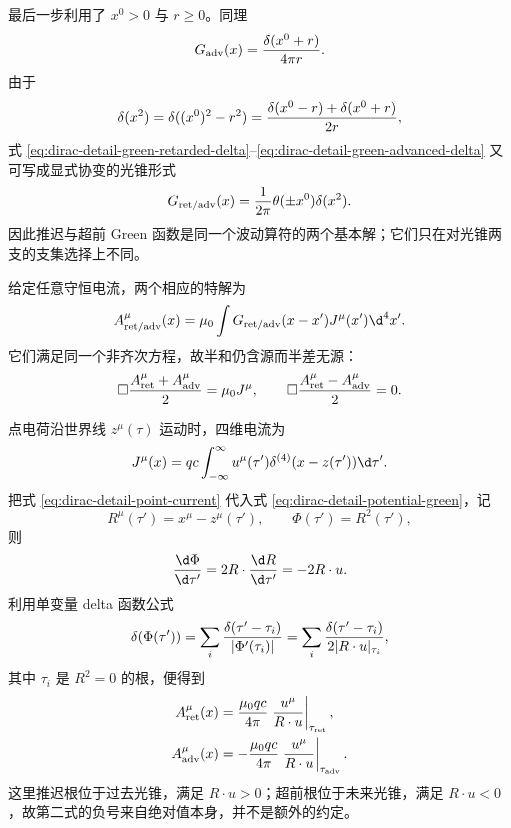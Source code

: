 最后一步利用了 $x^0>0$ 与 $r\geq0$。同理
\begin{equation}
 G_{\mathrm{adv}}(x)={\delta(x^0+r)\over4\pi r}.
 \label{eq:dirac-detail-green-advanced-delta}
\end{equation}
由于
\begin{equation*}
 \delta(x^2)
 =\delta((x^0)^2-r^2)
 ={\delta(x^0-r)+\delta(x^0+r)\over2r},
\end{equation*}
式 \eqref{eq:dirac-detail-green-retarded-delta}--\eqref{eq:dirac-detail-green-advanced-delta} 又可写成显式协变的光锥形式
\begin{equation}
 G_{\mathrm{ret/adv}}(x)
 ={1\over2\pi}\theta(\pm x^0)\delta(x^2).
 \label{eq:dirac-detail-green-lightcone}
\end{equation}
因此推迟与超前 Green 函数是同一个波动算符的两个基本解；它们只在对光锥两支的支集选择上不同。

给定任意守恒电流，两个相应的特解为
\begin{equation}
 A_{\mathrm{ret/adv}}^\mu(x)
 =\mu_0\int G_{\mathrm{ret/adv}}(x-x')J^\mu(x')\d^4x'.
 \label{eq:dirac-detail-potential-green}
\end{equation}
它们满足同一个非齐次方程，故半和仍含源而半差无源：
\begin{equation}
 \Box{A_{\mathrm{ret}}^\mu+A_{\mathrm{adv}}^\mu\over2}
 =\mu_0J^\mu,
 \qquad
 \Box{A_{\mathrm{ret}}^\mu-A_{\mathrm{adv}}^\mu\over2}=0.
 \label{eq:dirac-detail-green-sum-diff}
\end{equation}

点电荷沿世界线 $z^\mu(\tau)$ 运动时，四维电流为
\begin{equation}
 J^\mu(x)=qc\int_{-\infty}^{\infty}
 u^\mu(\tau')\delta^{(4)}(x-z(\tau'))\d\tau'.
 \label{eq:dirac-detail-point-current}
\end{equation}
把式 \eqref{eq:dirac-detail-point-current} 代入式 \eqref{eq:dirac-detail-potential-green}，记
\begin{equation*}
 R^\mu(\tau')=x^\mu-z^\mu(\tau'),
 \qquad
 \Phi(\tau')=R^2(\tau'),
\end{equation*}
则
\begin{equation*}
 {\d\Phi\over\d\tau'}
 =2R\cdot{\d R\over\d\tau'}
 =-2R\cdot u.
\end{equation*}
利用单变量 delta 函数公式
\begin{equation*}
 \delta(\Phi(\tau'))
 =\sum_i{\delta(\tau'-\tau_i)\over|\Phi'(\tau_i)|}
 =\sum_i{\delta(\tau'-\tau_i)\over2|R\cdot u|_{\tau_i}},
\end{equation*}
其中 $\tau_i$ 是 $R^2=0$ 的根，便得到
\begin{align}
 A_{\mathrm{ret}}^\mu(x)
 &= {\mu_0qc\over4\pi}
 \left.{u^\mu\over R\cdot u}\right|_{\tau_{\mathrm{ret}}},
 \notag\\
 A_{\mathrm{adv}}^\mu(x)
 &=-{\mu_0qc\over4\pi}
 \left.{u^\mu\over R\cdot u}\right|_{\tau_{\mathrm{adv}}}.
 \label{eq:dirac-detail-LW-potentials}
\end{align}
这里推迟根位于过去光锥，满足 $R\cdot u>0$；超前根位于未来光锥，满足 $R\cdot u<0$，故第二式的负号来自绝对值本身，并不是额外的约定。

